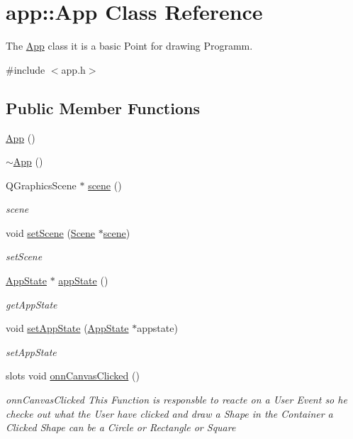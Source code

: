 \hypertarget{classapp_1_1_app}{}\section{app\+:\+:App Class Reference}
\label{classapp_1_1_app}


The \mbox{\hyperlink{classapp_1_1_app}{App}} class it is a basic Point for drawing Programm.  




{\ttfamily \#include $<$app.\+h$>$}

\subsection*{Public Member Functions}
\begin{DoxyCompactItemize}
\item 
\mbox{\hyperlink{classapp_1_1_app_a4a289c6cb8f8d34895492cc66ed0be8e}{App}} ()
\item 
\mbox{\hyperlink{classapp_1_1_app_ac5e7d7e1bf46f87ea894830d8aa2cc08}{$\sim$\+App}} ()
\item 
Q\+Graphics\+Scene $\ast$ \mbox{\hyperlink{classapp_1_1_app_ad1cdc5d0a6c5017548fcdc7f86a2f496}{scene}} ()
\begin{DoxyCompactList}\small\item\em scene \end{DoxyCompactList}\item 
void \mbox{\hyperlink{classapp_1_1_app_a4ce3fa5bea946dbe89a6a451768a9dc4}{set\+Scene}} (\mbox{\hyperlink{class_scene}{Scene}} $\ast$\mbox{\hyperlink{classapp_1_1_app_ad1cdc5d0a6c5017548fcdc7f86a2f496}{scene}})
\begin{DoxyCompactList}\small\item\em set\+Scene \end{DoxyCompactList}\item 
\mbox{\hyperlink{classapp_1_1_app_state}{App\+State}} $\ast$ \mbox{\hyperlink{classapp_1_1_app_a6bbccc1f287168e3514cd390aea73d50}{app\+State}} ()
\begin{DoxyCompactList}\small\item\em get\+App\+State \end{DoxyCompactList}\item 
void \mbox{\hyperlink{classapp_1_1_app_afd4230600c1a17e7b02764acd132de5b}{set\+App\+State}} (\mbox{\hyperlink{classapp_1_1_app_state}{App\+State}} $\ast$appstate)
\begin{DoxyCompactList}\small\item\em set\+App\+State \end{DoxyCompactList}\item 
slots void \mbox{\hyperlink{classapp_1_1_app_aca8be846f8cd12968ccbefcc1ce43a4f}{onn\+Canvas\+Clicked}} ()
\begin{DoxyCompactList}\small\item\em onn\+Canvas\+Clicked This Function is responsble to reacte on a User Event so he checke out what the User have clicked and draw a Shape in the Container a Clicked Shape can be a Circle or Rectangle or Square \end{DoxyCompactList}\end{DoxyCompactItemize}
